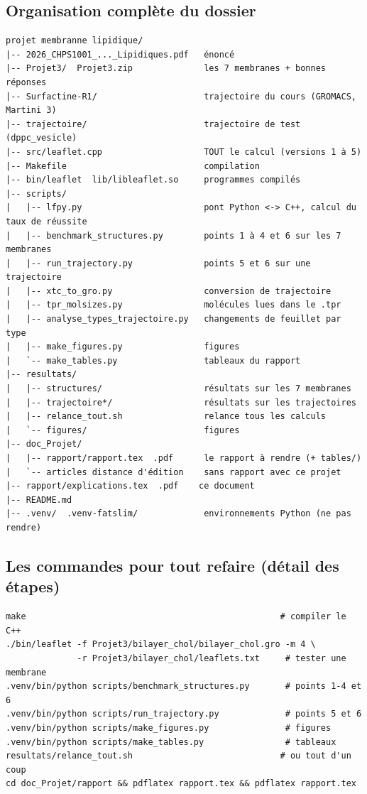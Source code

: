 \documentclass[11pt,a4paper]{article}
\begin{document}
\subsection{Organisation complète du dossier}
\begin{lstlisting}
projet membranne lipidique/
|-- 2026_CHPS1001_..._Lipidiques.pdf   énoncé
|-- Projet3/  Projet3.zip              les 7 membranes + bonnes réponses
|-- Surfactine-R1/                     trajectoire du cours (GROMACS, Martini 3)
|-- trajectoire/                       trajectoire de test (dppc_vesicle)
|-- src/leaflet.cpp                    TOUT le calcul (versions 1 à 5)
|-- Makefile                           compilation
|-- bin/leaflet  lib/libleaflet.so     programmes compilés
|-- scripts/
|   |-- lfpy.py                        pont Python <-> C++, calcul du taux de réussite
|   |-- benchmark_structures.py        points 1 à 4 et 6 sur les 7 membranes
|   |-- run_trajectory.py              points 5 et 6 sur une trajectoire
|   |-- xtc_to_gro.py                  conversion de trajectoire
|   |-- tpr_molsizes.py                molécules lues dans le .tpr
|   |-- analyse_types_trajectoire.py   changements de feuillet par type
|   |-- make_figures.py                figures
|   `-- make_tables.py                 tableaux du rapport
|-- resultats/
|   |-- structures/                    résultats sur les 7 membranes
|   |-- trajectoire*/                  résultats sur les trajectoires
|   |-- relance_tout.sh                relance tous les calculs
|   `-- figures/                       figures
|-- doc_Projet/
|   |-- rapport/rapport.tex  .pdf      le rapport à rendre (+ tables/)
|   `-- articles distance d'édition    sans rapport avec ce projet
|-- rapport/explications.tex  .pdf    ce document
|-- README.md
|-- .venv/  .venv-fatslim/             environnements Python (ne pas rendre)
\end{lstlisting}

\subsection{Les commandes pour tout refaire (détail des étapes)}
\begin{lstlisting}
make                                                  # compiler le C++
./bin/leaflet -f Projet3/bilayer_chol/bilayer_chol.gro -m 4 \
              -r Projet3/bilayer_chol/leaflets.txt     # tester une membrane
.venv/bin/python scripts/benchmark_structures.py       # points 1-4 et 6
.venv/bin/python scripts/run_trajectory.py             # points 5 et 6
.venv/bin/python scripts/make_figures.py               # figures
.venv/bin/python scripts/make_tables.py                # tableaux
resultats/relance_tout.sh                             # ou tout d'un coup
cd doc_Projet/rapport && pdflatex rapport.tex && pdflatex rapport.tex
\end{lstlisting}
\end{document}
